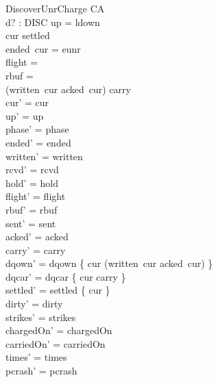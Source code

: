 \documentclass[a4paper,10pt,fleqn]{article}
\begin{document}
\begin{schema}{DiscoverUnrCharge}
  \Delta CA \\
  d? : DISC
\where
  up = ldown \\
  cur \notin settled \\
  ended~cur = eunr \\
  flight = \emptyset \\
  rbuf = \emptyset \\
  (written~cur \setminus acked~cur) \cup carry \neq \emptyset \\
  cur' = cur \\
  up' = up \\
  phase' = phase \\
  ended' = ended \\
  written' = written \\
  rcvd' = rcvd \\
  hold' = hold \\
  flight' = flight \\
  rbuf' = rbuf \\
  sent' = sent \\
  acked' = acked \\
  carry' = carry \\
  dqown' = dqown \cup \{ cur \mapsto (written~cur \setminus acked~cur) \} \\
  dqcar' = dqcar \cup \{ cur \mapsto carry \} \\
  settled' = settled \cup \{ cur \} \\
  dirty' = dirty \\
  strikes' = strikes \\
  chargedOn' = chargedOn \\
  carriedOn' = carriedOn \\
  times' = times \\
  pcrash' = pcrash
\end{schema}
\end{document}
